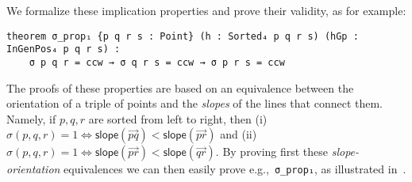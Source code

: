 We formalize these implication properties and prove their validity, as for example:
\begin{lstlisting}
theorem σ_prop₁ {p q r s : Point} (h : Sorted₄ p q r s) (hGp : InGenPos₄ p q r s) :
    σ p q r = ccw → σ q r s = ccw → σ p r s = ccw
\end{lstlisting}


The proofs of these properties are based on an equivalence between the orientation of a triple of points and the \emph{slopes} of the lines that connect them. Namely, if $p, q, r$  are sorted from left to right, then (i) $\sigma(p,q,r)=1 \iff \textsf{slope}(\vec{pq}) < \textsf{slope}(\vec{pr})$  and (ii) $\sigma(p,q,r)=1 \iff \textsf{slope}(\vec{pr}) < \textsf{slope}(\vec{qr})$. By proving first these \emph{slope-orientation} equivalences we can then easily prove e.g.,~\lstinline|σ_prop₁|, as illustrated in~.

